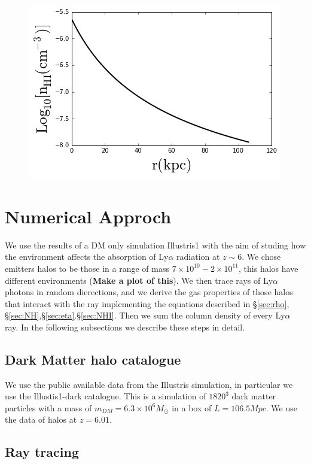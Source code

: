 \documentclass[12pt]{article}
\begin{document}
\begin{figure}[H]\label{fig:nhivsr}
\centering
\includegraphics[scale=0.7]{../figures/nhivsr.png}
\end{figure}  


\section{Numerical Approch}

We use the results of a DM only simulation Illustris1 with the aim 
of studing how the environment affects the absorption of 
Ly$\alpha$ radiation at $z\sim6$. We chose emitters halos to be 
those in a range of mass  $7 \times 10^{10} - 2 \times 10^{11}$, this 
halos have different environments (\textbf{Make a plot of this}).
We then trace rays of Ly$\alpha$ photons in random dierections, and we derive
the gas properties of those halos that interact with the ray 
implementing the equations described in \S \ref{sec:rho}, 
\S \ref{sec:NH},\S \ref{sec:eta}.\S \ref{sec:NHI}. Then we sum the column 
density of every Ly$\alpha$ ray. In the following subsections we describe 
these steps in detail.  

\subsection{Dark Matter halo catalogue}

We use the public available data from the Illustris simulation, in particular we use 
the Illustis1-dark catalogue. This is a simulation of $1820^3$ dark matter particles
with a mass of $m_{DM}=6.3 \times 10^6 M_{\odot}$ in a box of $L=106.5 Mpc$. We use 
the data of halos at $z = 6.01$. 

\subsection{Ray tracing}
\end{document}

